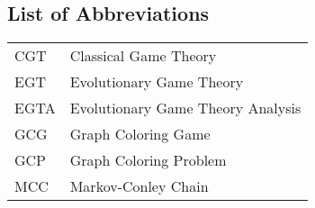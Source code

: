 \subsection*{List of Abbreviations}

\begin{longtable}[l]{ll}
    CGT  & Classical Game Theory \\
    EGT  & Evolutionary Game Theory \\
    EGTA & Evolutionary Game Theory Analysis \\
    GCG  & Graph Coloring Game \\
    GCP  & Graph Coloring Problem \\
    MCC  & Markov-Conley Chain \\
\end{longtable}